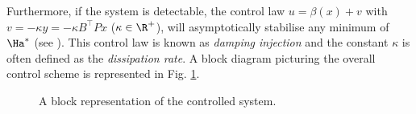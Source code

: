 %
Furthermore, if the system is detectable, the control law $u = \beta(x)+v$ with $v = - \kappa y = - \kappa B^\top Px$ ($\kappa\in\R^+$), will asymptotically stabilise any minimum of $\Ha^*$ (see \cite{secchi2007control}). 
This control law is known as \textit{damping injection} and the constant $\kappa$ is often defined as the \textit{dissipation rate}.
A block diagram  picturing the overall control scheme is represented in Fig. \ref{fig:block}.
%
\begin{figure}[!t]
	\centering
	
	\vspace{-2mm}
	\caption{\footnotesize A block representation of the controlled system.}
	\label{fig:block}
\end{figure}
%
%
%
%
